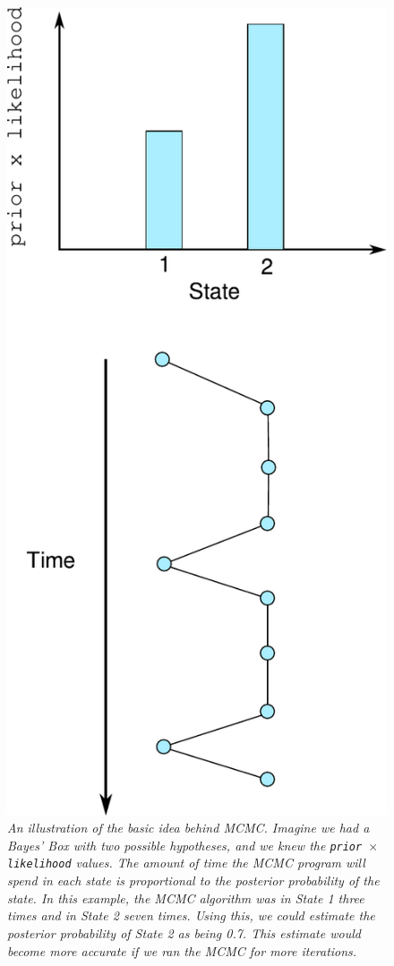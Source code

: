 \begin{figure}[ht!]
\begin{center}
\includegraphics[scale=0.65]{Figures/mcmc.pdf}
\caption{\it An illustration of the basic idea behind MCMC. Imagine we had a
Bayes' Box with two possible hypotheses, and we knew the
{\tt prior $\times$ likelihood} values. The amount of time the MCMC program will
spend in each state is proportional to the posterior probability of the state.
In this example, the MCMC algorithm was in State 1 three times and in State 2
seven times. Using this, we could estimate the posterior probability of State 2
as being 0.7. This estimate would become more accurate if we ran the MCMC for
more iterations.\label{fig:mcmc}}
\end{center}
\end{figure}

